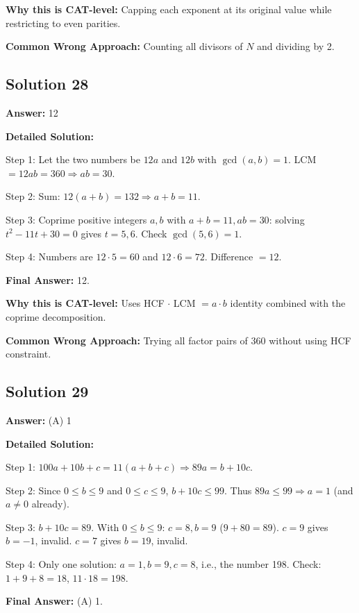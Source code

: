 \documentclass[11pt]{article}
\begin{document}
\textbf{Why this is CAT-level:} Capping each exponent at its original value while restricting to even parities.

\textbf{Common Wrong Approach:} Counting all divisors of $N$ and dividing by 2.

\subsection*{Solution 28}
\textbf{Answer:} 12

\textbf{Detailed Solution:}

Step 1: Let the two numbers be $12a$ and $12b$ with $\gcd(a, b) = 1$. LCM $= 12 a b = 360 \Rightarrow a b = 30$.

Step 2: Sum: $12(a + b) = 132 \Rightarrow a + b = 11$.

Step 3: Coprime positive integers $a, b$ with $a + b = 11, ab = 30$: solving $t^2 - 11t + 30 = 0$ gives $t = 5, 6$. Check $\gcd(5, 6) = 1$. \checkmark

Step 4: Numbers are $12 \cdot 5 = 60$ and $12 \cdot 6 = 72$. Difference $= 12$.

\textbf{Final Answer:} 12.

\textbf{Why this is CAT-level:} Uses HCF $\cdot$ LCM $= a \cdot b$ identity combined with the coprime decomposition.

\textbf{Common Wrong Approach:} Trying all factor pairs of 360 without using HCF constraint.

\subsection*{Solution 29}
\textbf{Answer:} (A) 1

\textbf{Detailed Solution:}

Step 1: $100a + 10b + c = 11(a + b + c) \Rightarrow 89 a = b + 10 c$.

Step 2: Since $0 \le b \le 9$ and $0 \le c \le 9$, $b + 10c \le 99$. Thus $89 a \le 99 \Rightarrow a = 1$ (and $a \ne 0$ already).

Step 3: $b + 10c = 89$. With $0 \le b \le 9$: $c = 8, b = 9$ ($9 + 80 = 89$). $c = 9$ gives $b = -1$, invalid. $c = 7$ gives $b = 19$, invalid.

Step 4: Only one solution: $a = 1, b = 9, c = 8$, i.e., the number 198. Check: $1 + 9 + 8 = 18$, $11 \cdot 18 = 198$. \checkmark

\textbf{Final Answer:} (A) 1.
\end{document}
